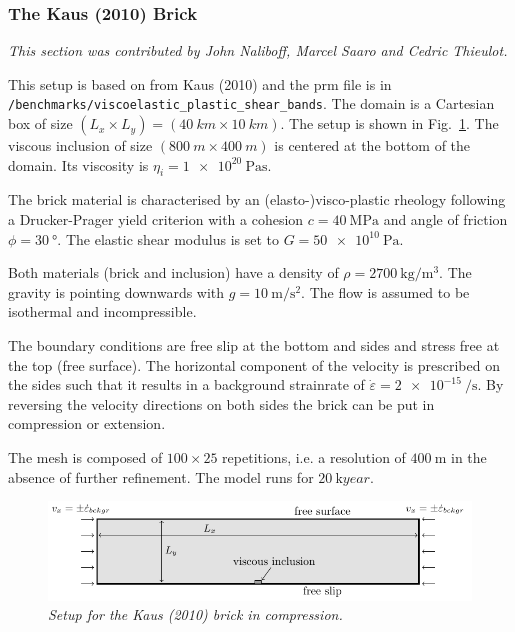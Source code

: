 \subsubsection{The Kaus (2010) Brick}
\label{sec:benchmarks-the-kaus_2010-brick}

\textit{This section was contributed by John Naliboff, Marcel Saaro and Cedric Thieulot.}

This setup is based on from Kaus (2010) \cite{kaus10} and the  prm file is in {\tt /benchmarks/viscoelastic\_plastic\_shear\_bands}. The domain is a Cartesian box of size $(L_x \times L_y)=(\SI{40}{km} \times \SI{10}{km})$.
The setup is shown in Fig.~\ref{fig:kaus_brick}. 
The viscous inclusion of size $(\SI{800}{m} \times \SI{400}{m})$ is centered at the bottom of the domain. Its viscosity is $\eta_i=\SI{1e20}{\pascal\second}$.

The brick material is characterised by an (elasto-)visco-plastic
rheology following a Drucker-Prager yield criterion with a cohesion $c=\SI{40}{\mega\pascal}$ and angle of 
friction $\phi=\SI{30}{\degree}$. The elastic shear modulus is set to $G=\SI{50e10}{\pascal}$.

Both materials (brick and inclusion) have a density of $\rho=\SI{2700}{\kg\per\cubic\meter}$. The gravity is pointing downwards with $g=\SI{10}{\meter\per\square\second}$.
The flow is assumed to be isothermal and incompressible.

The boundary conditions are free slip at the bottom and sides and stress free at the top (free surface). The horizontal component of the velocity is prescribed on the sides such that it results in a background strainrate of $\dot{\varepsilon}=\SI{2e-15}{\per\second}$. By reversing the velocity directions on both sides the brick can be put in compression or extension. 

The mesh is composed of $100\times25$ repetitions, i.e. a resolution of $\SI{400}{\m}$ in the absence of further refinement. The model runs for $\SI{20}{\kilo year}$.

\begin{figure}[h]
\centering
\includegraphics{../../benchmarks/viscoelastic_plastic_shear_bands/kaus_2010/doc/kaus_2010_brick_setup.pdf}
\caption{\it Setup for the Kaus (2010) brick in compression.}
\label{fig:kaus_brick}
\end{figure}

